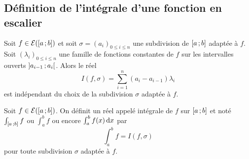 \subsection{Définition de l'intégrale d'une fonction en escalier}

\begin{theo}
  Soit $f \in \mathcal{E}(\left[ a \, ;  b \right])$ et soit $\sigma=(a_i)_{0 \leq i \leq n}$ une subdivision de $\left[ a \, ;  b \right]$ adaptée à $f$. Soit $(\lambda_i)_{0 \leq i \leq n}$ une famille de fonctions constantes de $f$ sur les intervalles ouverts $\left] a_{i-1} \, ;  a_i \right[$. Alors le réel
  \begin{equation}
    I(f,\sigma) = \sum_{i=1}^n (a_i-a_{i-1})\lambda_i
  \end{equation}
  est indépendant du choix de la subdivision $\sigma$ adaptée à $f$.
\end{theo}

\begin{defdef}
  Soit $f \in \mathcal{E}(\left[ a \, ;  b \right])$. On définit un réel appelé intégrale de $f$ sur $\left[ a \, ;  b \right]$ et noté $\int_{\left[ a \, ;  b \right]}f$ ou $\int_a^b f$ ou encore $\int_a^b f(x) \mathop{}\mathopen{}\mathrm{d} x$ par
  \begin{equation}
    \int_a^b f = I(f,\sigma)
  \end{equation}
  pour toute subdivision $\sigma$ adaptée à $f$.
\end{defdef}


